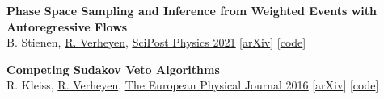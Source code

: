 \documentclass[a4paper,12pt]{article}
\begin{document}
\textbf{Phase Space Sampling and Inference from Weighted Events with Autoregressive Flows} \\
B. Stienen, \underline{R. Verheyen}, 
\href{https://scipost.org/10.21468/SciPostPhys.10.2.038}{\underline{SciPost Physics 2021}} [\href{https://arxiv.org/pdf/2011.13445.pdf}{arXiv}] [\href{https://github.com/rbvh/PhaseSpaceAutoregressiveFlow}{code}]

\textbf{Competing Sudakov Veto Algorithms} \\
R. Kleiss, \underline{R. Verheyen},
\href{https://link.springer.com/article/10.1140/epjc/s10052-016-4231-5}{\underline{The European Physical Journal 2016}} [\href{https://arxiv.org/pdf/1605.09246.pdf}{arXiv}] [\href{https://github.com/rbvh/Veto-Algorithm-Toy-Shower}{code}]





\end{document}
